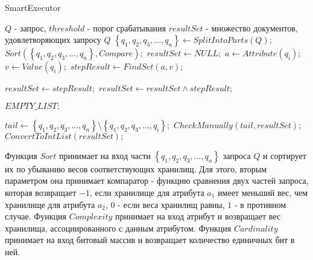 \documentclass{matmex-diploma}
\begin{document}
        \begin{algorithm}[H]                   
        \caption{SmartExecutor}              
        \label{smart}                        
            \begin{algorithmic}        
                \REQUIRE $Q$ - запрос, $threshold$ - порог срабатывания
                \ENSURE $resultSet$ - множество документов, удовлетворяющих запросу $Q$
                \STATE $\left\{ q_1, q_2, q_3, ... , q_n \right\} \leftarrow SplitIntoParts(Q);$
                \STATE $Sort(\left\{ q_1, q_2, q_3, ... , q_n \right\}, Compare);$
                \STATE $resultSet \leftarrow NULL;$
                    \STATE $a \leftarrow Attribute(q_i);$
                    \STATE $v \leftarrow Value(q_i);$
                    \STATE $stepResult \leftarrow FindSet(a, v);$
                    
                        \STATE $resultSet \leftarrow stepResult;$
                    \ELSE
                        \STATE $resultSet \leftarrow resultSet \land stepResult;$
                    \ENDIF
                    
                        \RETURN $EMPTY\_LIST;$
                    \ENDIF
                    
                        \STATE $tail \leftarrow \left\{ q_1, q_2, q_3, ... , q_n \right\} \setminus \left\{ q_1, q_2, q_3, ... , q_i \right\};$
                        \RETURN $CheckManually(tail, resultSet);$
                    \ENDIF
                \ENDFOR
                \RETURN $ConvertToIntList(resultSet);$
            \end{algorithmic}
        \end{algorithm}
        
        Функция $Sort$ принимает на вход части $\left\{ q_1, q_2, q_3, ... , q_n \right\}$ запроса $Q$ и сортирует их по убыванию весов соответствующих хранилищ. Для этого, вторым параметром она принимает компаратор - функцию сравнения двух частей запроса, которая возвращает $-1$, если хранилище для атрибута $a_1$ имеет меньший вес, чем хранилище для атрибута $a_2$, $0$ - если веса хранилищ равны, $1$ - в противном случае. Функция $Complexity$ принимает на вход атрибут и возвращает вес хранилища, ассоциированного с данным атрибутом. Функция $Cardinality$ принимает на вход битовый массив и возвращает количество единичных бит в ней.
        
\end{document}
